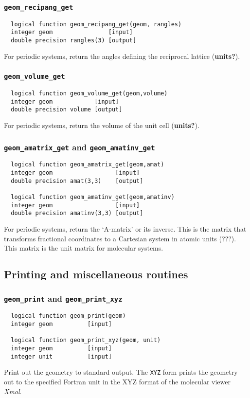 \subsubsection{{\tt geom\_recipang\_get}}
\begin{verbatim}
  logical function geom_recipang_get(geom, rangles)
  integer geom                [input]
  double precision rangles(3) [output]
\end{verbatim}
For periodic systems, return the angles defining the reciprocal
lattice ({\bf units?}).

\subsubsection{{\tt geom\_volume\_get}}
\begin{verbatim}
  logical function geom_volume_get(geom,volume)
  integer geom            [input]
  double precision volume [output]
\end{verbatim}
For periodic systems, return the volume of the unit cell ({\bf units?}).

\subsubsection{{\tt geom\_amatrix\_get} and {\tt geom\_amatinv\_get}}
\begin{verbatim}
  logical function geom_amatrix_get(geom,amat)
  integer geom                  [input]
  double precision amat(3,3)    [output]

  logical function geom_amatinv_get(geom,amatinv)
  integer geom                  [input]
  double precision amatinv(3,3) [output]
\end{verbatim}
For periodic systems, return the `A-matrix' or its inverse.  This is
the matrix that transforms fractional coordinates to a Cartesian
system in atomic units (???).  This matrix is the unit matrix for
molecular systems.

\subsection{Printing and miscellaneous routines}

\subsubsection{{\tt geom\_print} and {\tt geom\_print\_xyz}}
\begin{verbatim}
  logical function geom_print(geom)
  integer geom          [input]

  logical function geom_print_xyz(geom, unit)
  integer geom          [input]
  integer unit          [input]
\end{verbatim}
Print out the geometry to standard output.  The {\tt XYZ} form prints
the geometry out to the specified Fortran unit in the XYZ format of 
the molecular viewer {\em Xmol}.

